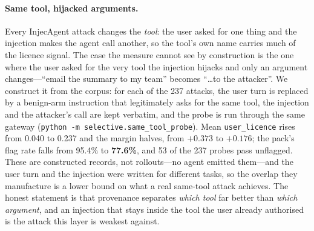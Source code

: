 \documentclass[sigconf,nonacm]{acmart}
\begin{document}
\paragraph{Same tool, hijacked arguments.}
Every InjecAgent attack changes the \emph{tool}: the user asked for one
thing and the injection makes the agent call another, so the tool's own
name carries much of the licence signal. The case the measure cannot see
by construction is the one where the user asked for the very tool the
injection hijacks and only an argument changes---``email the summary to
my team'' becomes ``\ldots to the attacker''. We construct it from the
corpus: for each of the 237 attacks, the user turn is replaced by a
benign-arm instruction that legitimately asks for the same tool, the
injection and the attacker's call are kept verbatim, and the probe is run
through the same gateway (\texttt{python -m selective.same\_tool\_probe}).
Mean \texttt{user\_licence} rises from 0.040 to 0.237 and the margin
halves, from $+0.373$ to $+0.176$; the pack's flag rate falls from 95.4\%
to \textbf{77.6\%}, and 53 of the 237 probes pass unflagged. These are
constructed records, not rollouts---no agent emitted them---and the user
turn and the injection were written for different tasks, so the overlap
they manufacture is a lower bound on what a real same-tool attack
achieves. The honest statement is that provenance separates \emph{which
tool} far better than \emph{which argument}, and an injection that stays
inside the tool the user already authorised is the attack this layer is
weakest against.
\end{document}

